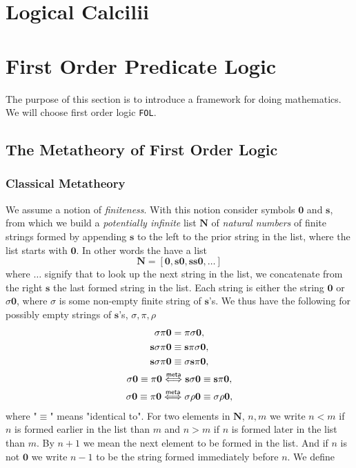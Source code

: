 \appendix
\section{Logical Calcilii}
\section{First Order Predicate Logic}
The purpose of this section is to introduce a framework for doing mathematics. We will choose first order logic \verb|FOL|.
\subsection{The Metatheory of First Order Logic}
\subsubsection{Classical Metatheory}
We assume a notion of \emph{finiteness}. With this notion consider symbols $\mathbf{0}$ and $\mathbf{s}$, from which we build a \emph{potentially infinite} list $\mathbf{N}$ of \emph{natural numbers} of finite strings formed by appending $\mathbf{s}$ to the left to the prior string in the list, where the list starts with $\mathbf{0}$. In other words the have a list
$$\mathbf{N} = [\mathbf{0},\mathbf{s0},\mathbf{ss0},\dots]$$ 
where $\dots$ signify that to look up the next string in the list, we concatenate from the right $\mathbf{s}$ the last formed string in the list. Each string is either the string $\mathbf{0}$ or $\sigma\mathbf{0}$, where $\sigma$ is some non-empty finite string of $\mathbf{s}$'s. We thus have the following for possibly empty strings of $\mathbf{s}$'s, $\sigma, \pi,\rho$
\begin{gather*}
    \sigma\pi \mathbf{0} = \pi\sigma \mathbf{0},\\
    \mathbf{s}\sigma\pi\mathbf{0} \equiv \mathbf{s}\pi\sigma\mathbf{0},\\
    \mathbf{s}\sigma\pi\mathbf{0}\equiv \sigma \mathbf{s}\pi\mathbf{0},\\
    \sigma\mathbf{0} \equiv \pi\mathbf{0} \mathrel{\overset{\mathsf{meta}}{\Longleftrightarrow}} \mathbf{s}\sigma\mathbf{0}\equiv \mathbf{s}\pi\mathbf{0},\\
    \sigma\mathbf{0}\equiv \pi\mathbf{0} \mathrel{\overset{\mathsf{meta}}{\Longleftrightarrow}} \sigma\rho\mathbf{0}\equiv \sigma\rho\mathbf{0}, 
\end{gather*}
where "$\equiv$" means "identical to". For two elements in $\mathbf{N}$, $n,m$ we write $n<m$ if $n$ is formed earlier in the list than $m$ and $n>m$ if $n$ is formed later in the list than $m$. By $n+1$ we mean the next element to be formed in the list. And if $n$ is not $\mathbf{0}$ we write $n-1$ to be the string formed immediately before $n$. We define 

